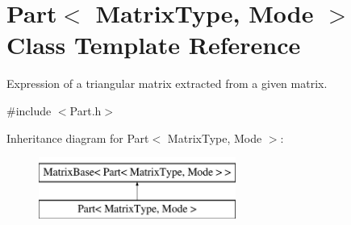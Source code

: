 \hypertarget{class_part}{\section{Part$<$ Matrix\-Type, Mode $>$ Class Template Reference}
\label{class_part}
}


Expression of a triangular matrix extracted from a given matrix.  




{\ttfamily \#include $<$Part.\-h$>$}

Inheritance diagram for Part$<$ Matrix\-Type, Mode $>$\-:\begin{figure}[H]
\begin{center}
\leavevmode
\includegraphics[height=2.000000cm]{class_part}
\end{center}
\end{figure}
